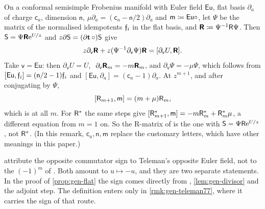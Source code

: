 \begin{rmk}
\label{rmk:gen-ppz12}
On a conformal semisimple Frobenius manifold with Euler field $\mathsf{Eu}$, flat basis $\partial_a$ of charge $\mathsf{c}_a$, dimension $\mathsf{n}$, $\mu\partial_a=(\mathsf{c}_a-\mathsf{n}/2)\partial_a$ and $\mathsf{m}\coloneqq\mathsf{Eu}\circ$, let $\Psi$ be the matrix of the normalised idempotents $\mathfrak{f}_i$ in the flat basis, and $\boldsymbol{\mathsf{R}}\coloneqq\Psi^{-1}\mathsf{R}\Psi$. Then $\mathsf{S}=\Psi\boldsymbol{\mathsf{R}}\mathrm{e}^{U/z}$ and $z\partial\mathsf{S}=(\partial\mathbf{t}\,\circ)\mathsf{S}$ give
\[
z\partial_{\mathsf{v}}\boldsymbol{\mathsf{R}}+z(\Psi^{-1}\partial_{\mathsf{v}}\Psi)\boldsymbol{\mathsf{R}}=[\partial_{\mathsf{v}}U,\boldsymbol{\mathsf{R}}].
\]
Take $\mathsf{v}=\mathsf{Eu}$: then $\partial_{\mathsf{v}}U=U$, $\ \partial_{\mathsf{v}}\genbR_m=-m\genbR_m$, and $\partial_{\mathsf{v}}\Psi=-\mu\Psi$, which follows from $[\mathsf{Eu},\mathfrak{f}_i]=(\mathsf{n}/2-1)\mathfrak{f}_i$ and $[\mathsf{Eu},\partial_a]=(\mathsf{c}_a-1)\partial_a$. At $z^{m+1}$, and after conjugating by $\Psi$,
\[
[\mathsf{R}_{m+1},\mathsf{m}]=(m+\mu)\mathsf{R}_m,
\]
which is \cite[eq.~(12)]{PPZ15} at all $m$. For $\mathsf{R}^*$ the same steps give $[\mathsf{R}^*_{m+1},\mathsf{m}]=-m\mathsf{R}^*_m+\mathsf{R}^*_m\mu$, a different equation from $m=1$ on. So the R-matrix of \cite{PPZ15} is the one with $\mathsf{S}=\Psi\mathsf{R}\mathrm{e}^{U/z}$, not $\mathsf{R}^*$. (In this remark, $\mathsf{c}_a,\mathsf{n},\mathsf{m}$ replace the customary letters, which have other meanings in this paper.)
\end{rmk}

\begin{rmk}
\label{rmk:gen-attr}
\cite[footnote 10 and Remark 1.6]{PPZ15} attribute the opposite commutator sign to Teleman's opposite Euler field, not to the $(-1)^m$ of \cite[Def.~7.1]{Tel12}. Both amount to $u\mapsto-u$, and they are two separate statements. In the proof of \cref{prop:gen-flat} the sign comes directly from \cite[Def.~2.2]{PPZ15}, \cref{lem:gen-divisor} and the adjoint step. The definition \cite[Def.~7.1]{Tel12} enters only in \cref{rmk:gen-teleman77}, where it carries the sign of that route.
\end{rmk}

